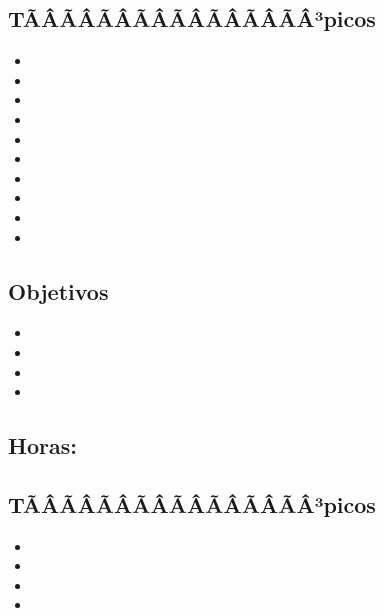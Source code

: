 \subsection*{TÃÂÃÂÃÂÃÂÃÂÃÂÃÂÃÂ³picos}
\begin{itemize}
	\item \DSTRESTopicNociones
	\item \DSTRESTopicEstructura
	\item \DSTRESTopicPruebas
	\item \DSTRESTopicPruebasy
	\item \DSTRESTopicPruebaspor
	\item \DSTRESTopicPruebasporcontradiccion
	\item \DSTRESTopicInduccion
	\item \DSTRESTopicInduccionfuerte
	\item \DSTRESTopicDefiniciones
	\item \DSTRESTopicEl
\end{itemize}

\subsection*{Objetivos}
\begin{itemize}
	\item \DSTRESObjUNO
	\item \DSTRESObjDOS
	\item \DSTRESObjTRES
	\item \DSTRESObjCUATRO
\end{itemize}

\subsection{\DSCUATRODef}\label{sec:BOK-DS4}
\subsection*{Horas: \DSCUATROHours}

\subsection*{TÃÂÃÂÃÂÃÂÃÂÃÂÃÂÃÂ³picos}
\begin{itemize}
	\item \DSCUATROTopicArgumentos
	\item \DSCUATROTopicPrincipio
	\item \DSCUATROTopicPermutaciones
	\item \DSCUATROTopicSolucion
\end{itemize}

